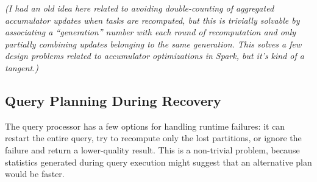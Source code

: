 \documentclass[12pt]{article}
\begin{document}
\emph{(I had an old idea here related to avoiding double-counting of
aggregated accumulator updates when tasks are recomputed, but this is
trivially solvable by associating a ``generation'' number with each round of
recomputation and only partially combining updates belonging to the same
generation.  This solves a few design problems related to accumulator
optimizations in Spark, but it's kind of a tangent.)}

\subsection{Query Planning During Recovery}

The query processor has a few options for handling runtime failures: it can
restart the entire query, try to recompute only the lost partitions, or ignore
the failure and return a lower-quality result.  This is a non-trivial problem,
because statistics generated during query execution might suggest that an
alternative plan would be faster.



\pagebreak


\end{document}
